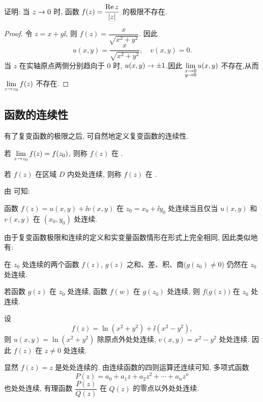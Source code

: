 \begin{example}
  证明: 当 $z\rightarrow 0$ 时, 函数 $f(z)=\dfrac{\operatorname{Re} z}{\lvert z\rvert}$ 的极限不存在.
\end{example}

\begin{proof}
  令 $z=x+y\ii$, 则 $f(z)=\dfrac x{\sqrt{x^2+y^2}}$.
  因此
  \[
    u(x,y)=\frac x{\sqrt{x^2+y^2}},\quad v(x,y)=0.
  \]
  当 $z$ 在实轴原点两侧分别趋向于 $0$ 时, $u(x,y)\rightarrow\pm1$.因此 $\lim\limits_{\substack{x\rightarrow 0\\y\rightarrow 0}}u(x,y)$ 不存在,从而 $\lim\limits_{z\rightarrow z_0}f(z)$ 不存在.
\end{proof}


\subsection{函数的连续性}

有了复变函数的极限之后, 可自然地定义复变函数的连续性.
\begin{definition}
  \label{def:continuous}
  \begin{enuma}
    \item 若 $\lim\limits_{z\rightarrow z_0}f(z)=f(z_0)$, 则称 $f(z)$ 在 .
    \item 若 $f(z)$ 在区域 $D$ 内处处连续, 则称 $f(z)$ 在 .
  \end{enuma}
\end{definition}

由 可知:
\begin{theorem}
  函数 $f(z)=u(x,y)+\ii v(x,y)$ 在 $z_0=x_0+\ii y_0$ 处连续当且仅当 $u(x,y)$ 和 $v(x,y)$ 在 $(x_0,y_0)$ 处连续.
\end{theorem}

由于复变函数极限和连续的定义和实变量函数情形在形式上完全相同, 因此类似地有:
\begin{theorem}
  \begin{enuma}
    \item 在 $z_0$ 处连续的两个函数 $f(z)$, $g(z)$ 之和、差、积、商($g(z_0)\neq 0$) 仍然在 $z_0$ 处连续.
    \item 若函数 $g(z)$ 在 $z_0$ 处连续, 函数 $f(w)$ 在 $g(z_0)$ 处连续, 则 $f\bigl(g(z)\bigr)$ 在 $z_0$ 处连续.
  \end{enuma}
\end{theorem}

\begin{exampleenum}
  \item 设
  \[
    f(z)=\ln(x^2+y^2)+\ii(x^2-y^2),
  \]
  则 $u(x,y)=\ln(x^2+y^2)$ 除原点外处处连续, $v(x,y)=x^2-y^2$ 处处连续. 因此 $f(z)$ 在 $z\neq0$ 处连续.
  \item 显然 $f(z)=z$ 是处处连续的.
  由连续函数的四则运算还连续可知, 多项式函数
  \[
    P(z)=a_0+a_1z+a_2z^2+\cdots+a_nz^n
  \]
  也处处连续, 有理函数 $\dfrac{P(z)}{Q(z)}$ 在 $Q(z)$ 的零点以外处处连续.
\end{exampleenum}

